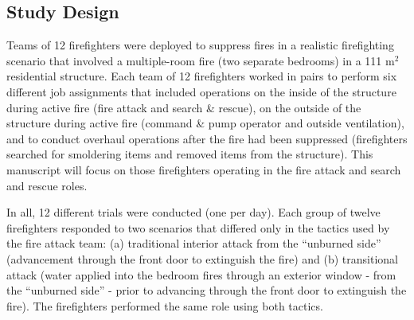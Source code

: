 \documentclass[12pt,oneside]{article}
\begin{document}
\subsection{Study Design}
\label{subsec:design}


Teams of 12 firefighters were deployed to suppress fires in a realistic firefighting scenario that involved a multiple-room fire (two separate bedrooms) in a 111 m$^2$ residential structure. Each team of 12 firefighters worked in pairs to perform six different job assignments that included operations on the inside of the structure during active fire (fire attack and search \& rescue), on the outside of the structure during active fire (command \& pump operator and outside ventilation), and to conduct overhaul operations after the fire had been suppressed (firefighters searched for smoldering items and removed items from the structure). This manuscript will focus on those firefighters operating in the fire attack and search and rescue roles. 

In all, 12 different trials were conducted (one per day). Each group of twelve firefighters responded to two scenarios that differed only in the tactics used by the fire attack team: (a) traditional interior attack from the ``unburned side'' (advancement through the front door to extinguish the fire) and (b) transitional attack (water applied into the bedroom fires through an exterior window - from the ``unburned side'' - prior to advancing through the front door to extinguish the fire).  The firefighters performed the same role using both tactics. 
\end{document}
